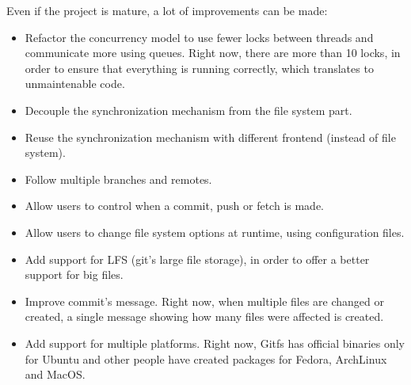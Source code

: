 Even if the project is mature, a lot of improvements can be made:
\begin{itemize}
    \item Refactor the concurrency model to use fewer locks between threads and communicate more using queues. Right now, there are more than 10 locks, in order to ensure that everything is running correctly, which translates to unmaintenable code.
    \item Decouple the synchronization mechanism from the file system part.
    \item Reuse the synchronization mechanism with different frontend (instead of file system).
    \item Follow multiple branches and remotes.
    \item Allow users to control when a commit, push or fetch is made.
    \item Allow users to change file system options at runtime, using configuration files.
    \item Add support for LFS (git's large file storage), in order to offer a better support for big files.
    \item Improve commit's message. Right now, when multiple files are changed or created, a single message showing how many files were affected is created.
    \item Add support for multiple platforms. Right now, Gitfs has official binaries only for Ubuntu and other people have created packages for Fedora, ArchLinux and MacOS.
\end{itemize}
    
